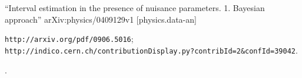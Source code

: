 \begin{thebibliography}{99}
 {``Interval estimation in the presence of nuisance parameters. 1. Bayesian approach''} arXiv:physics/0409129v1 [physics.data-an]

 {\tt http://arxiv.org/pdf/0906.5016}; \\
{\tt http://indico.cern.ch/contributionDisplay.py?contribId=2\&confId=39042}.

.



\end{thebibliography}
